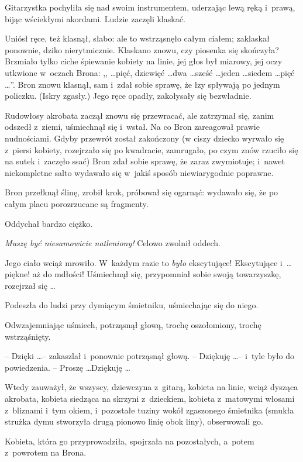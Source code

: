 \documentclass[oneside,polish,11pt,rmheadings]{mwbk}
\begin{document}
Gitarzystka pochyliła się nad swoim instrumentem, uderzając lewą ręką i~prawą, bijąc wściekłymi akordami. Ludzie zaczęli klaskać. 

Uniósł ręce, też klasnął, słabo: ale to wstrząsnęło całym ciałem; zaklaskał ponownie, dziko nierytmicznie. Klaskano znowu, czy piosenka się skończyła? Brzmiało tylko ciche śpiewanie kobiety na linie, jej głos był miarowy, jej oczy utkwione w~oczach Brona: ,, \ldots pięć, dziewięć \ldots dwa \ldots sześć \ldots jeden \ldots siedem \ldots pięć  \ldots ''. Bron znowu klasnął, sam i~zdał sobie sprawę, że łzy spływają po jednym policzku. (Iskry zgasły.) Jego ręce opadły, zakołysały się bezwładnie. 

Rudowłosy akrobata zaczął znowu się przewracać, ale zatrzymał się, zanim odszedł z~ziemi, uśmiechnął się i~wstał. Na co Bron zareagował prawie nudnościami. Gdyby przewrót został zakończony (w ciszy dziecko wyrwało się z~piersi kobiety, rozejrzało się po kwadracie, zamrugało, po czym znów rzuciło się na sutek i~zaczęło ssać) Bron zdał sobie sprawę, że zaraz zwymiotuje; i~nawet niekompletne salto wydawało się w~jakiś sposób niewiarygodnie poprawne. 

Bron przełknął ślinę, zrobił krok, próbował się ogarnąć: wydawało się, że po całym placu porozrzucane są fragmenty. 

Oddychał bardzo ciężko. 

\textit{Muszę być niesamowicie natleniony!} Celowo zwolnił oddech. 

Jego ciało wciąż mrowiło. W~każdym razie to \textit{było } ekscytujące! Ekscytujące i~\ldots  piękne! aż do mdłości! Uśmiechnął się, przypomniał sobie swoją towarzyszkę, rozejrzał się \ldots  

Podeszła do ludzi przy dymiącym śmietniku, uśmiechając się do niego. 

Odwzajemniając uśmiech, potrząsnął głową, trochę oszołomiony, trochę wstrząśnięty.

 -- Dzięki \ldots  -- zakaszlał i~ponownie potrząsnął głową. -- Dziękuję \ldots -- i~tyle było do powiedzenia. -- Proszę  \ldots  Dziękuję \ldots  

Wtedy zauważył, że wszyscy, dziewczyna z~gitarą, kobieta na linie, wciąż dysząca akrobata, kobieta siedząca na skrzyni z~dzieckiem, kobieta z~matowymi włosami z~bliznami i~tym okiem, i~pozostałe tuziny wokół zgaszonego śmietnika (smukła strużka dymu stworzyła drugą pionowo linię obok liny), obserwowali go. 

Kobieta, która go przyprowadziła, spojrzała na pozostałych, a~potem z~powrotem na Brona. 
\end{document}
